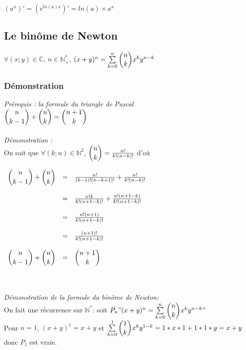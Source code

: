 \documentclass[a4paper,10pt]{book}
\newcommand{\N}{\mathbb{N}}
\newcommand{\C}{\mathbb{C}}
\begin{document}
$(a^{x})'=(e^{ln(a)x})'=ln(a)\times a^{x}$
\newpage

\subsection{Le binôme de Newton} 
\begin{center} \begin{Large} $\forall (x;y)\in \C$, $n \in \N^{*}_{+}$, $(x+y)^{n}=\sum \limits_{k=0}^{n} \dbinom{n}{k} x^{k} y^{n-k}$ \end{Large} \end{center}

\subsubsection{Démonstration}
\emph{Prérequis : la formule du triangle de Pascal}\\

$\dbinom{n}{k-1}+\dbinom{n}{k}=\dbinom{n+1}{k}$\\\\

\textit{Démonstration :}\\
On sait que $\forall (k;n) \in \N^{2}$, $\dbinom{n}{k}=\frac{n!}{k!(n-k)!}$ d'où\\

\begin{large} $\begin{array}{rcl} \dbinom{n}{k-1}+\dbinom{n}{k} &=&\frac{n!}{(k-1)!(n-k+1)!}+\frac{n!}{k!(n-k)!}\\\\
&=&\frac{n!k}{k!(n+1-k)!}+\frac{n!(n+1-k)}{k!(n+1-k)!}\\\\
&=&\frac{n!(n+1)}{k!(n+1-k)!}\\\\
&=&\frac{(n+1)!}{k!(n+1-k)!}\\\\
\dbinom{n}{k-1}+\dbinom{n}{k}&=&\dbinom{n+1}{k} \end{array}$ \end{large}\\\\

\emph{Démonstration de la formule du binôme de Newton:}\\
On fait une récurrence sur $\N^{*}$: soit $P_{n}{}"(x+y)^{n}=\sum \limits_{k=0}^{n} \dbinom{n}{k} x^{k} y^{n-k}"$\\
Pour $n=1$, $(x+y)^{1}=x+y$ et $\sum \limits_{k=0}^{1} \dbinom{1}{k} x^{k} y^{1-k}=1*x*1+1*1*y=x+y$\\
donc $P_{1}$ est vraie.\\
\end{document}
